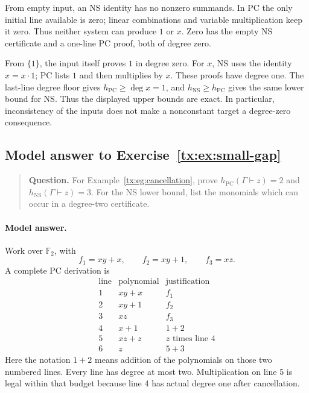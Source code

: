\documentclass[11pt,a4paper,oneside,openany]{book}
\theoremstyle{definition}\newtheorem{definition}[theorem]{Definition}
\theoremstyle{remark}\newtheorem{remark}[theorem]{Remark}
\newcommand{\NS}{\mathrm{NS}}\newcommand{\PC}{\mathrm{PC}}
\numberwithin{equation}{chapter}
\begin{document}
From empty input, an NS identity has no nonzero summands. In PC the
only initial line available is zero; linear combinations and variable
multiplication keep it zero. Thus neither system can produce \(1\)
or \(x\). Zero has the empty NS certificate and a one-line PC proof,
both of degree zero.

From \(\{1\}\), the input itself proves \(1\) in degree zero.
For \(x\), NS uses the identity \(x=x\cdot1\); PC lists \(1\) and
then multiplies by \(x\). These proofs have degree one. The last-line
degree floor gives \(h_{\PC}\ge\deg x=1\), and
\(h_{\NS}\ge h_{\PC}\) gives the same lower bound for NS.
Thus the displayed upper bounds are exact. In particular, inconsistency
of the inputs does not make a nonconstant target a degree-zero consequence.


\par


\begin{samepage}

\subsection*{Model answer to Exercise~\ref{tx:ex:small-gap}}\label{tx:ans:small-gap}

\begin{quote}\small\textbf{Question.} For Example~\ref{tx:eg:cancellation}, prove
$h_{\PC}(\Gamma\vdash z)=2$ and
$h_{\NS}(\Gamma\vdash z)=3$. For the NS lower bound, list the monomials
which can occur in a degree-two certificate.
\end{quote}

\paragraph{Model answer.}
Work over \(\mathbb F_2\), with
\[
 f_1=xy+x,\qquad f_2=xy+1,\qquad f_3=xz.
\]
A complete PC derivation is
\[
 \begin{array}{c|l|l}
 \text{line}&\text{polynomial}&\text{justification}\\ \hline
 1&xy+x&f_1\\
 2&xy+1&f_2\\
 3&xz&f_3\\
 4&x+1&1+2\\
 5&xz+z&z\text{ times line }4\\
 6&z&5+3
 \end{array}
\]
Here the notation \(1+2\) means addition of the polynomials on those
two numbered lines. Every line has degree at most two. Multiplication
on line 5 is legal within that budget because line 4 has actual
degree one after cancellation.
\end{samepage}
\end{document}
